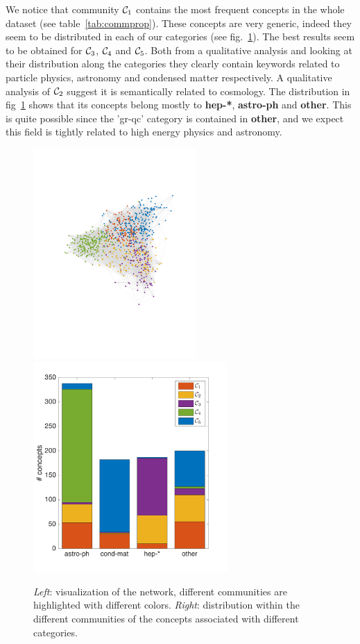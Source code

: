 \documentclass[a4paper,12pt,twoside]{article}
\def \bf {\textbf}
\def \comm {{{\cal C}}}
\begin{document}
We notice that community $\comm_1$ contains the most frequent concepts in the whole dataset (see table~\ref{tab:commprop}).
These concepts are very generic, indeed they seem to be distributed in each of our categories (see fig.~\ref{fig:comm}).
The best results seem to be obtained for $\comm_3$, $\comm_4$ and $\comm_5$.
 Both from a qualitative analysis and looking at their distribution along the categories they clearly contain keywords related to particle physics, astronomy and condensed matter respectively.
A qualitative analysis of $\comm_2$ suggest it is semantically related to cosmology. 
The distribution in fig~\ref{fig:comm} shows that its concepts belong mostly to \bf{hep-*}, \bf{astro-ph} and \bf{other}. 
This is quite possible since the 'gr-qc' category is contained in \bf{other}, and we expect this field is tightly related to high energy physics and astronomy.
\begin{figure}
  \centerline{
   \includegraphics[height=8cm,width=\textwidth,keepaspectratio]{../img/communities_graph.pdf}
   \includegraphics[height=8cm,width=\textwidth,keepaspectratio]{../img/categories_communities.pdf}
  }
  \caption{{\em Left}: visualization of the network, different communities are highlighted with different colors. {\em Right}: distribution within the different communities of the concepts associated with different categories.}
  \label{fig:comm}
\end{figure}
\end{document}

